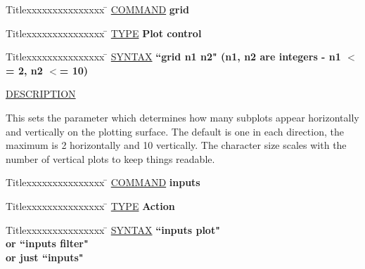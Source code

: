 \begin{tabbing}
Titlexxxxxxxxxxxxxxx \= \kill
\underline{COMMAND} \> {\bf 	grid} \\
\end{tabbing}

\begin{tabbing}
Titlexxxxxxxxxxxxxxx \= \kill
\underline{TYPE} \> {\bf 		Plot control} \\
\end{tabbing}

\begin{tabbing}
Titlexxxxxxxxxxxxxxx \= \kill
\underline{SYNTAX} \> {\bf 		``grid n1 n2" (n1, n2 are integers - n1 $<$= 2, n2 $<$= 10)} \\
\end{tabbing}

\underline{DESCRIPTION}
\begin{list}{}{\setlength{\leftmargin}{0.5in}
     \setlength{\rightmargin}{0in}}
\item
This sets the parameter which determines how many subplots
appear horizontally and vertically on the plotting surface.
The default is one in each direction, the maximum is 2
horizontally and 10 vertically.  The character size scales
with the number of vertical plots to keep things readable.
\end{list}
\vspace{.2in}

\begin{tabbing}
Titlexxxxxxxxxxxxxxx \= \kill
\underline{COMMAND} \> {\bf    inputs} \\
\end{tabbing}

\begin{tabbing}
Titlexxxxxxxxxxxxxxx \= \kill
\underline{TYPE} \> {\bf            Action} \\
\end{tabbing}

\begin{tabbing}
Titlexxxxxxxxxxxxxxx \= \kill
\underline{SYNTAX} \> {\bf          ``inputs plot"} \\
\> {\bf             or  ``inputs filter"} \\
\> {\bf         or just ``inputs"} \\
\end{tabbing}

